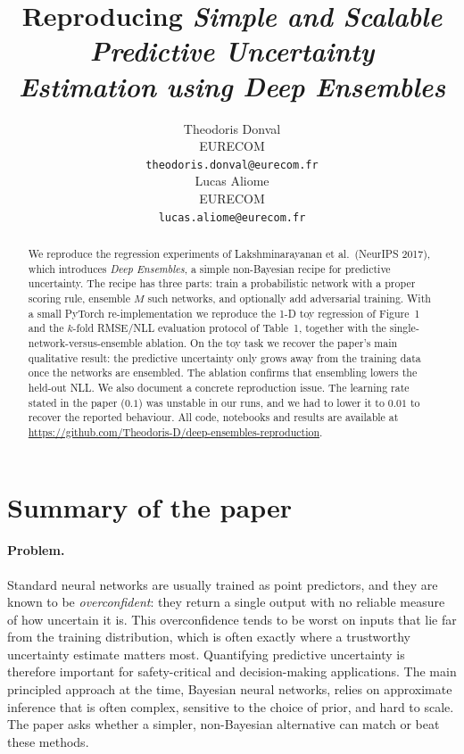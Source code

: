 \documentclass{article}
\title{Reproducing \emph{Simple and Scalable Predictive Uncertainty\\
Estimation using Deep Ensembles}}
\author{%
  Theodoris Donval \\
  EURECOM \\
  \texttt{theodoris.donval@eurecom.fr} \\
  \And
  Lucas Aliome \\
  EURECOM \\
  \texttt{lucas.aliome@eurecom.fr} \\
}
\begin{document}
\maketitle

\begin{abstract}
We reproduce the regression experiments of Lakshminarayanan et al.\ (NeurIPS
2017), which introduces \emph{Deep Ensembles}, a simple non-Bayesian recipe for
predictive uncertainty. The recipe has three parts: train a probabilistic
network with a proper scoring rule, ensemble $M$ such networks, and optionally
add adversarial training. With a small PyTorch re-implementation we reproduce
the 1-D toy regression of Figure~1 and the $k$-fold RMSE/NLL evaluation protocol
of Table~1, together with the single-network-versus-ensemble ablation. On the
toy task we recover the paper's main qualitative result: the predictive
uncertainty only grows away from the training data once the networks are
ensembled. The ablation confirms that ensembling lowers the held-out NLL. We
also document a concrete reproduction issue. The learning rate stated in the
paper ($0.1$) was unstable in our runs, and we had to lower it to $0.01$ to
recover the reported behaviour. All code, notebooks and results are available at
\url{https://github.com/Theodoris-D/deep-ensembles-reproduction}.
\end{abstract}

\section{Summary of the paper}

\paragraph{Problem.}
Standard neural networks are usually trained as point predictors, and they are
known to be \emph{overconfident}: they return a single output with no reliable
measure of how uncertain it is. This overconfidence tends to be worst on inputs
that lie far from the training distribution, which is often exactly where a
trustworthy uncertainty estimate matters most. Quantifying predictive
uncertainty is therefore important for safety-critical and decision-making
applications. The main principled approach at the time, Bayesian neural
networks, relies on approximate inference that is often complex, sensitive to
the choice of prior, and hard to scale. The paper asks whether a simpler,
non-Bayesian alternative can match or beat these methods.
\end{document}
